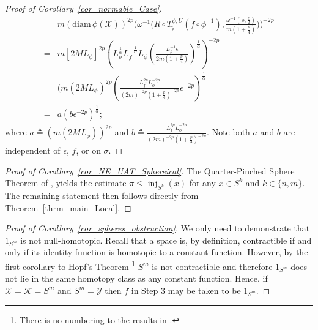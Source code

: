 \documentclass[anon,12pt]{colt2021} %
\newcommand{\xxx}{\mathcal{X}}
\newcommand{\yyy}{\mathcal{Y}}
\newcommand{\kkk}{{\mathscr{K}}}
\begin{document}
\begin{proof}[{Proof of Corollary~\ref{cor_normable_Case}}]
\begin{align*}
        & m (\text{diam} \, \phi(\mathcal{X}))^{2p} \bigg(\omega^{-1} (R \circ T_{\tilde \epsilon}^{\psi, U} (f \circ \phi^{-1}), \frac{\omega^{-1}(\rho, \frac{\epsilon}{2})}{m(1+\frac{p}{4})} \big) \bigg)^{-2p} 
        \\
        = &
        m[2ML_{\phi}]^{2p}
        \left(
        L_{\rho}^{\frac1{\alpha}}L_f^{-\frac1{\alpha}}L_{\phi}
            \left(
                    \frac{L_{\rho}^{-1}\epsilon}{2m(1+\frac{p}{4})}
            \right)^{\frac1{\alpha}}
        \right)^{-2p}\\
        = & 
        (m(2ML_{\phi})^{2p}
        \left(
        \frac{
        L_f^{2p}
        L_{\phi}^{-2p}
        }{
        (2m)^{-2p}\left(
            1+\frac{p}{4}
        \right)^{-2p}
        }
        \epsilon^{-2p}
        \right)^{\frac1{\alpha}}
        \\
        = &
        a \left(
        b\epsilon^{-2p}
        \right)^{\frac1{\alpha}}
        ;
\end{align*}
where $
a \triangleq (m(2ML_{\phi}))^{2p}
$ and $
b\triangleq \frac{
        L_f^{2p}
        L_{\phi}^{-2p}
        }{
        (2m)^{-2p}\left(
            1+\frac{p}{4}
        \right)^{-2p}
        }
$.  Note both $a$ and $b$ are independent of $\epsilon$, $f$, or on $\sigma$.  
\end{proof}

\begin{proof}[{Proof of Corollary~\ref{cor_NE_UAT_Sphereical}}]
The Quarter-Pinched Sphere Theorem of \cite{klingenberg1991simple}, yields the estimate $\pi\leq \operatorname{inj}_{S^k}(x)$ for any $x \in S^k$ and $k\in \{n,m\}$.  The remaining statement then follows directly from Theorem~\ref{thrm_main_Local}.  
\end{proof}

\begin{proof}[{Proof of Corollary~\ref{cor_spheres_obstruction}}]
We only need to demonstrate that $1_{S^m}$ is not null-homotopic.  Recall that a space is, by definition, contractible if and only if its identity function is homotopic to a constant function.  However, by the first corollary to Hopf's Theorem \citep[page 125]{FuchsFomenkoHomotopicalTopology2016Edition2}\footnote{There is no numbering to the results in \cite{FuchsFomenkoHomotopicalTopology2016Edition2}.} $S^m$ is not contractible and therefore $1_{S^m}$ does not lie in the same homotopy class as any constant function.  Hence, if $\xxx=\kkk=S^m$ and $S^m=\yyy$ then $f$ in Step 3 may be taken to be $1_{S^m}$.  
\end{proof}
\end{document}
